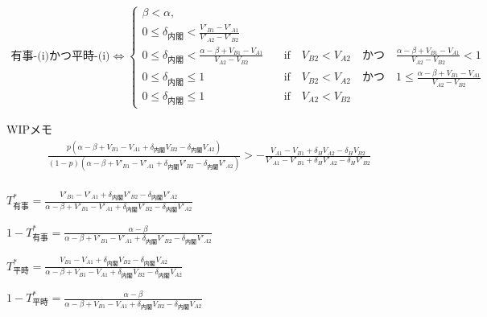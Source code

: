 \documentclass[main.tex]{subfiles}
\begin{document}
\begin{align*}
    \text{有事-(i)かつ平時-(i)} \Leftrightarrow 
    \begin{cases}
        \beta < \alpha, \\
        0 \le \delta_{内閣} < \frac{V'_{B1}-V'_{A1}}{V'_{A2} - V'_{B2}}\\
        0 \le \delta_{内閣} < \frac{\alpha-\beta + V_{B1}-V_{A1}}{V_{A2} - V_{B2}} \quad&\text{if}\quad V_{B2} < V_{A2} \quad{かつ}\quad \frac{\alpha-\beta + V_{B1}-V_{A1}}{V_{A2} - V_{B2}}<1\\
        0 \le \delta_{内閣} \le 1 \quad&\text{if}\quad V_{B2} < V_{A2} \quad{かつ}\quad 1 \le \frac{\alpha-\beta + V_{B1}-V_{A1}}{V_{A2} - V_{B2}}\\
        0 \le \delta_{内閣} \le 1 \quad&\text{if}\quad V_{A2} < V_{B2}
    \end{cases}
\end{align*}






\newpage
WIPメモ
\begin{align*}
    \frac{ p( \alpha-\beta + V_{B1}-V_{A1} + \delta_{内閣}V_{B2} - \delta_{内閣}V_{A2} ) }{ (1-p)( \alpha-\beta + V'_{B1}-V'_{A1} + \delta_{内閣}V'_{B2} - \delta_{内閣}V'_{A2} ) }    >    - \frac{ V_{A1} - V_{B1} + \delta_H V_{A2} - \delta_H V_{B2} }{ V'_{A1} -V'_{B1} + \delta_H V'_{A2} - \delta_H V'_{B2} } \\[1em]
\end{align*}




\begin{definition} \Large$T^*_{有事} = \frac{ V'_{B1} - V'_{A1} +\delta_{内閣}V'_{B2} - \delta_{内閣}V'_{A2} }{ \alpha-\beta + V'_{B1}-V'_{A1} + \delta_{内閣}V'_{B2} - \delta_{内閣}V'_{A2} }$ \end{definition}

\begin{definition} \Large$1 - T^*_{有事} = \frac{ \alpha-\beta }{ \alpha-\beta + V'_{B1}-V'_{A1} + \delta_{内閣}V'_{B2} - \delta_{内閣}V'_{A2} }$ \end{definition}


\begin{definition} \Large$T^*_{平時} = \frac{ V_{B1} - V_{A1} +\delta_{内閣}V_{B2} - \delta_{内閣}V_{A2} }{ \alpha-\beta + V_{B1}-V_{A1} + \delta_{内閣}V_{B2} - \delta_{内閣}V_{A2} }$ \end{definition}

\begin{definition} \Large$1 - T^*_{平時} = \frac{ \alpha-\beta }{ \alpha-\beta + V_{B1}-V_{A1} + \delta_{内閣}V_{B2} - \delta_{内閣}V_{A2} }$ \end{definition}





\theendnotes
\end{document}
